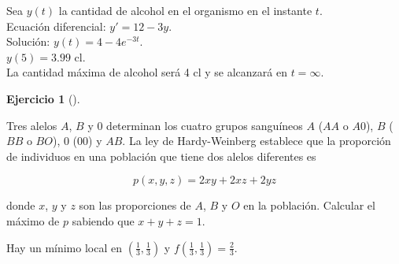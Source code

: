 \documentclass[
  a4paper,
]{scrreport}
\theoremstyle{definition}
\newtheorem{exercise}{Ejercicio}[chapter]
\theoremstyle{remark}
\begin{document}
\begin{tcolorbox}[enhanced jigsaw, opacitybacktitle=0.6, titlerule=0mm, bottomtitle=1mm, toptitle=1mm, breakable, bottomrule=.15mm, left=2mm, opacityback=0, toprule=.15mm, leftrule=.75mm, colframe=quarto-callout-tip-color-frame, coltitle=black, rightrule=.15mm, colback=white, title=\textcolor{quarto-callout-tip-color}{\faLightbulb}\hspace{0.5em}{Solución}, arc=.35mm, colbacktitle=quarto-callout-tip-color!10!white]

Sea \(y(t)\) la cantidad de alcohol en el organismo en el instante
\(t\).\\
Ecuación diferencial: \(y'=12-3y\).\\
Solución: \(y(t)=4-4e^{-3t}\).\\
\(y(5)=3.99\) cl.\\
La cantidad máxima de alcohol será 4 cl y se alcanzará en \(t=\infty\).

\end{tcolorbox}

\begin{exercise}[]\protect\hypertarget{exr-3}{}\label{exr-3}

Tres alelos \(A\), \(B\) y \(0\) determinan los cuatro grupos sanguíneos
\(A\) (\(AA\) o \(A0\)), \(B\) (\(BB\) o \(BO\)), \(0\) (\(00\)) y
\(AB\). La ley de Hardy-Weinberg establece que la proporción de
individuos en una población que tiene dos alelos diferentes es

\[
p(x,y,z)=2xy+2xz+2yz
\]

donde \(x\), \(y\) y \(z\) son las proporciones de \(A\), \(B\) y \(O\)
en la población. Calcular el máximo de \(p\) sabiendo que \(x+y+z=1\).

\end{exercise}

\begin{tcolorbox}[enhanced jigsaw, opacitybacktitle=0.6, titlerule=0mm, bottomtitle=1mm, toptitle=1mm, breakable, bottomrule=.15mm, left=2mm, opacityback=0, toprule=.15mm, leftrule=.75mm, colframe=quarto-callout-tip-color-frame, coltitle=black, rightrule=.15mm, colback=white, title=\textcolor{quarto-callout-tip-color}{\faLightbulb}\hspace{0.5em}{Solución}, arc=.35mm, colbacktitle=quarto-callout-tip-color!10!white]

Hay un mínimo local en \(\left(\frac{1}{3},\frac{1}{3}\right)\) y
\(f\left(\frac{1}{3},\frac{1}{3}\right)=\frac{2}{3}\).

\end{tcolorbox}
\end{document}
